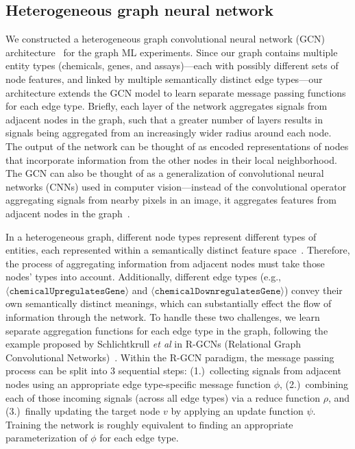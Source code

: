 \documentclass{ws-procs11x85}
\begin{document}
\subsection{Heterogeneous graph neural network}
We constructed a heterogeneous graph convolutional neural network (GCN) architecture~\cite{kipf2016semi} for the graph ML experiments.
Since our graph contains multiple entity types (chemicals, genes, and assays)---each with possibly different sets of node features, and linked by multiple semantically distinct edge types---our architecture extends the GCN model to learn separate message passing functions for each edge type.
Briefly, each layer of the network aggregates signals from adjacent nodes in the graph, such that a greater number of layers results in signals being aggregated from an increasingly wider radius around each node.
The output of the network can be thought of as encoded representations of nodes that incorporate information from the other nodes in their local neighborhood.
The GCN can also be thought of as a generalization of convolutional neural networks (CNNs) used in computer vision---instead of the convolutional operator aggregating signals from nearby pixels in an image, it aggregates features from adjacent nodes in the graph~\cite{chen2019multi}.

In a heterogeneous graph, different node types represent different types of entities, each represented within a semantically distinct feature space~\cite{zhang2019heterogeneous}.
Therefore, the process of aggregating information from adjacent nodes must take those nodes' types into account.
Additionally, different edge types (e.g., $\langle \mathtt{chemicalUpregulatesGene}\rangle$ and $\langle \mathtt{chemicalDownregulatesGene}\rangle$) convey their own semantically distinct meanings, which can substantially effect the flow of information through the network.
To handle these two challenges, we learn separate aggregation functions for each edge type in the graph, following the example proposed by Schlichtkrull \textit{et al} in R-GCNs (Relational Graph Convolutional Networks)~\cite{schlichtkrull2018modeling}.
Within the R-GCN paradigm, the message passing process can be split into 3 sequential steps: (1.)~collecting signals from adjacent nodes using an appropriate edge type-specific message function $\phi$, (2.)~combining each of those incoming signals (across all edge types) via a reduce function $\rho$, and (3.)~finally updating the target node $v$ by applying an update function $\psi$.
Training the network is roughly equivalent to finding an appropriate parameterization of $\phi$ for each edge type.
\end{document}
